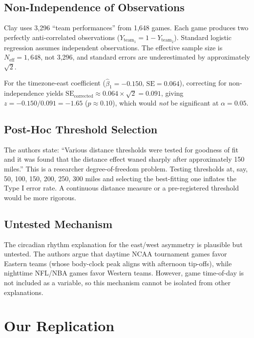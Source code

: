 \documentclass[11pt]{article}
\begin{document}
\subsection{Non-Independence of Observations}

Clay uses 3,296 ``team performances'' from 1,648 games. Each game produces two perfectly anti-correlated observations ($Y_{\text{team}_1} = 1 - Y_{\text{team}_2}$). Standard logistic regression assumes independent observations. The effective sample size is $N_{\text{eff}} = 1{,}648$, not 3,296, and standard errors are underestimated by approximately $\sqrt{2}$.

For the timezone-east coefficient ($\hat{\beta}_1 = -0.150$, $\text{SE} = 0.064$), correcting for non-independence yields $\text{SE}_{\text{corrected}} \approx 0.064 \times \sqrt{2} = 0.091$, giving $z = -0.150/0.091 = -1.65$ ($p \approx 0.10$), which would \emph{not} be significant at $\alpha = 0.05$.

\subsection{Post-Hoc Threshold Selection}

The authors state: ``Various distance thresholds were tested for goodness of fit and it was found that the distance effect waned sharply after approximately 150 miles.'' This is a researcher degree-of-freedom problem. Testing thresholds at, say, 50, 100, 150, 200, 250, 300 miles and selecting the best-fitting one inflates the Type I error rate. A continuous distance measure or a pre-registered threshold would be more rigorous.

\subsection{Untested Mechanism}

The circadian rhythm explanation for the east/west asymmetry is plausible but untested. The authors argue that daytime NCAA tournament games favor Eastern teams (whose body-clock peak aligns with afternoon tip-offs), while nighttime NFL/NBA games favor Western teams. However, game time-of-day is not included as a variable, so this mechanism cannot be isolated from other explanations.

\section{Our Replication}
\end{document}
